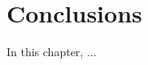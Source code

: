 \chapter{Conclusions}
\label{chap-6-conclusions}
\begin{ChapAbstract}
In this chapter, ...
\end{ChapAbstract}


